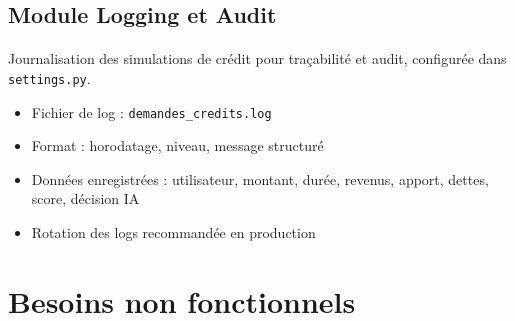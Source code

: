 \documentclass[12pt,a4paper]{report}
\begin{document}
\subsection{Module Logging et Audit}
\paragraph{}Journalisation des simulations de crédit pour traçabilité et audit, configurée dans \texttt{settings.py}.
\begin{itemize}[leftmargin=1.5cm]
    \item Fichier de log : \texttt{demandes\_credits.log}
    \item Format : horodatage, niveau, message structuré
    \item Données enregistrées : utilisateur, montant, durée, revenus, apport, dettes, score, décision IA
    \item Rotation des logs recommandée en production
\end{itemize}

\section{Besoins non fonctionnels}
\end{document}
